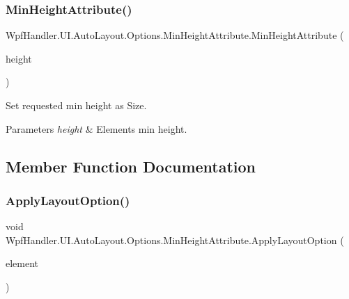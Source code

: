 \subsubsection{\texorpdfstring{Min\+Height\+Attribute()}{MinHeightAttribute()}\hspace{0.1cm}{\footnotesize\ttfamily [2/2]}}
{\footnotesize\ttfamily Wpf\+Handler.\+U\+I.\+Auto\+Layout.\+Options.\+Min\+Height\+Attribute.\+Min\+Height\+Attribute (\begin{DoxyParamCaption}\item[{double}]{height }\end{DoxyParamCaption})}



Set requested min height as Size. 


\begin{DoxyParams}{Parameters}
{\em height} & Element\textquotesingle{}s min height.\\
\hline
\end{DoxyParams}


\subsection{Member Function Documentation}
\mbox{\label{class_wpf_handler_1_1_u_i_1_1_auto_layout_1_1_options_1_1_min_height_attribute_a8c049220211484fea64fbd1589a4cc57}} 
\subsubsection{\texorpdfstring{Apply\+Layout\+Option()}{ApplyLayoutOption()}}
{\footnotesize\ttfamily void Wpf\+Handler.\+U\+I.\+Auto\+Layout.\+Options.\+Min\+Height\+Attribute.\+Apply\+Layout\+Option (\begin{DoxyParamCaption}\item[{Framework\+Element}]{element }\end{DoxyParamCaption})}



